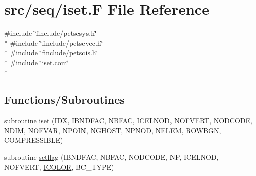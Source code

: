 \hypertarget{seq_2iset_8_f}{\section{src/seq/iset.F File Reference}
\label{seq_2iset_8_f}
}
{\ttfamily \#include \char`\"{}finclude/petscsys.\-h\char`\"{}}\\*
{\ttfamily \#include \char`\"{}finclude/petscvec.\-h\char`\"{}}\\*
{\ttfamily \#include \char`\"{}finclude/petscis.\-h\char`\"{}}\\*
{\ttfamily \#include \char`\"{}iset.\-com\char`\"{}}\\*
\subsection*{Functions/\-Subroutines}
\begin{DoxyCompactItemize}
\item 
subroutine \hyperlink{seq_2iset_8_f_af38962e0be9fc6bcabd0b07f202567e7}{iset} (I\-D\-X, I\-B\-N\-D\-F\-A\-C, N\-B\-F\-A\-C, I\-C\-E\-L\-N\-O\-D, N\-O\-F\-V\-E\-R\-T, N\-O\-D\-C\-O\-D\-E, N\-D\-I\-M, N\-O\-F\-V\-A\-R, \hyperlink{mesh_8com_ae28c1572321efcd8715b974d87d20c58}{N\-P\-O\-I\-N}, N\-G\-H\-O\-S\-T, N\-P\-N\-O\-D, \hyperlink{mesh_8com_aee5e75b79d0e815c0603cfbccc618957}{N\-E\-L\-E\-M}, R\-O\-W\-B\-G\-N, C\-O\-M\-P\-R\-E\-S\-S\-I\-B\-L\-E)
\item 
subroutine \hyperlink{seq_2iset_8_f_a66ee82f2074a3f320de34d4fb54d0c5f}{setflag} (I\-B\-N\-D\-F\-A\-C, N\-B\-F\-A\-C, N\-O\-D\-C\-O\-D\-E, N\-P, I\-C\-E\-L\-N\-O\-D, N\-O\-F\-V\-E\-R\-T, \hyperlink{bnd_8com_a80aa0313e1ef320813f587804c852992}{I\-C\-O\-L\-O\-R}, B\-C\-\_\-\-T\-Y\-P\-E)
\end{DoxyCompactItemize}


